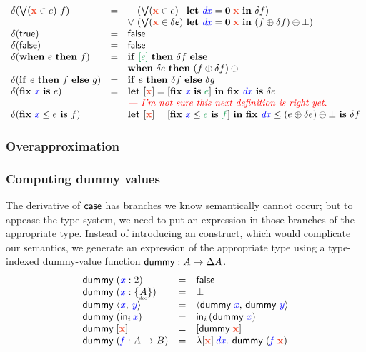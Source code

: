 \documentclass{article}
\newcommand{\dummy}{\ms{dummy}}
\newcommand{\preserve}[1]{{\color{ForestGreen}{#1}}}
\newcommand{\preservedisc}[1]{\preserve{\disc{#1}}}
\newcommand{\comment}[1]{\textit{--- {#1}}}
\begin{document}
\[\begin{array}{lcll}
  \delta(\setelim{\d{x}}{e}{f})
  &=& \phantom{\vee~} (\setelim{\d{x}}{e}
        {\phantom{\delta} \letv{\m{dx}}{\zero\; \d{x}} \delta f})\\
  && \vee~ (\setelim{\d{x}}{\delta e}
        {\letv{\m{dx}}{\zero\; \d{x}}
          (f \oplus \delta f) \ominus \unit})\\

  \delta(\etrue) &=& \efalse\\
  \delta(\efalse) &=& \efalse\\
  \delta(\when{e}{f})
  &=& \ifthen{\preservedisc{e}}{\delta f}{}\\
  && \when{\delta e}{(f \oplus \delta f) \ominus \unit}
  \\
  \delta(\ifthen{e}{f}{g}) &=& \ifthen{e}{\delta f}{\delta g}\\
  \delta(\fix{\m{x}}{e}) &=&
  \letdisc{\d{x}}
          {\disc{\fix{\m{x}} \preserve{e}}}
          {\fix{\m{dx}} \delta e}\\
  && \todo{\comment{I'm not sure this next definition is right yet.}}\\
  \delta(\fixle{\m{x}}{e}{f}) &=&
    \letdisc{\d x}{\disc{\fixle{\m x}{\preserve{e}}{\preserve{f}}}}
    \fixle{\m{dx}}{(e \oplus \delta e) \ominus \unit}{\delta f}
\end{array}
\]


\subsubsection{Overapproximation}



\subsubsection{Computing dummy values}

The derivative of $\mathsf{case}$ has branches we know semantically cannot occur; but to appease the type system, we need to put an expression in those branches of the appropriate type.
%
Instead of introducing an  construct, which would complicate our semantics, we generate an expression of the appropriate type using a type-indexed dummy-value function $\dummy{} : A \to \Ch{A}$.
%
\[
\begin{array}{lcl}
  \dummy\; (\m{x} : \tbool) &=& \efalse\\
  \dummy\; (\m{x} : \Seteq{A}) &=& \unit\\
  \dummy\; \pair{\m{x}}{\m{y}} &=& \pair{\dummy\;\m{x}}{\dummy\;\m{y}}\\
  \dummy\; (\inj{i}{\m{x}}) &=& \inj{i}{(\dummy\;\m{x})}\\
  \dummy\; \disc{\d{x}} &=& \disc{\dummy\; \d{x}}\\
  \dummy\; (\m{f} : A \to B) &=&
    \fn \disc{\d{x}} \, \m{dx} \binder\, \dummy\;(\m{f}\;\d{x})
\end{array}
\]
\end{document}
